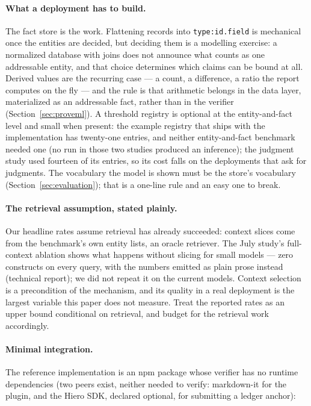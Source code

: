 \documentclass[11pt,a4paper]{article}
\begin{document}
\paragraph{What a deployment has to build.} The fact store is the work. Flattening records into \texttt{type:id.field} is mechanical once the entities are decided, but deciding them is a modelling exercise: a normalized database with joins does not announce what counts as one addressable entity, and that choice determines which claims can be bound at all. Derived values are the recurring case --- a count, a difference, a ratio the report computes on the fly --- and the rule is that arithmetic belongs in the data layer, materialized as an addressable fact, rather than in the verifier (Section~\ref{sec:proveml}). A threshold registry is optional at the entity-and-fact level and small when present: the example registry that ships with the implementation has twenty-one entries, and neither entity-and-fact benchmark needed one (no run in those two studies produced an inference); the judgment study used fourteen of its entries, so its cost falls on the deployments that ask for judgments. The vocabulary the model is shown must be the store's vocabulary (Section~\ref{sec:evaluation}); that is a one-line rule and an easy one to break.

\paragraph{The retrieval assumption, stated plainly.} Our headline rates assume retrieval has already succeeded: context slices come from the benchmark's own entity lists, an oracle retriever. The July study's full-context ablation shows what happens without slicing for small models --- zero constructs on every query, with the numbers emitted as plain prose instead (technical report); we did not repeat it on the current models. Context selection is a precondition of the mechanism, and its quality in a real deployment is the largest variable this paper does not measure. Treat the reported rates as an upper bound conditional on retrieval, and budget for the retrieval work accordingly.

\paragraph{Minimal integration.} The reference implementation is an npm package whose verifier has no runtime dependencies (two peers exist, neither needed to verify: markdown-it for the plugin, and the Hiero SDK, declared optional, for submitting a ledger anchor):
\end{document}
